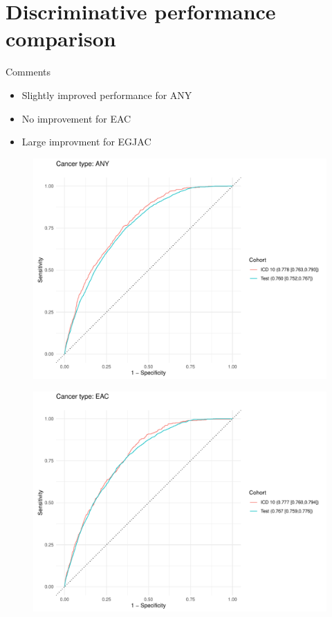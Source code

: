 \documentclass[english]{article}
\begin{document}
\newpage
\clearpage
\section{Discriminative performance comparison}

Comments
\begin{itemize}
	\item Slightly improved performance for ANY
	\item No improvement for EAC
	\item Large improvment for EGJAC
\end{itemize}

\begin{figure}[h]
\centering
\includegraphics[width=0.8\linewidth]{icd10/roc_ANY.pdf}
\end{figure}
\begin{figure}[h]
\centering
\includegraphics[width=0.8\linewidth]{icd10/roc_EAC.pdf}
\end{figure}
\end{document}
